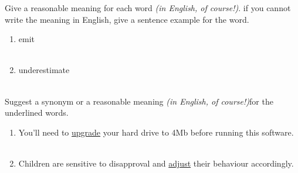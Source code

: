 \documentclass{exam}
\begin{document}
\begin{questions}
\question Give a reasonable meaning for each word \emph{(in English, of course!)}. if you cannot write the meaning in English, give a sentence example for the word.\\
\begin{enumerate}
	\item emit \\ \\
	\item underestimate \\ \\
\end{enumerate}
\question Suggest a synonym or a reasonable meaning \emph{(in English, of course!)}for the underlined words.\\
\begin{enumerate}
	\item You'll need to \underline{upgrade} your hard drive to 4Mb before running this software.\\ \\
	\item Children are sensitive to disapproval and \underline{adjust} their behaviour accordingly.\\ \\
\end{enumerate}

\end{questions}
\end{document}
